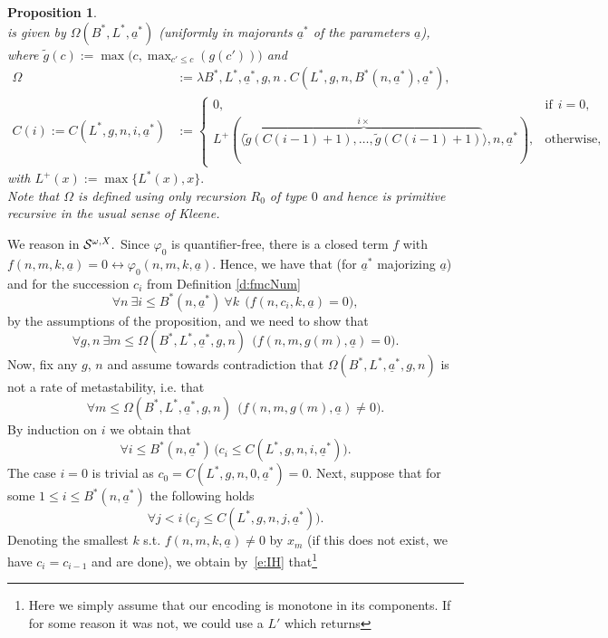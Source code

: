 \documentclass[1p]{elsarticle}
\newcommand{\be}[1][{e:\arabic{equation}}] { \begin{equation}\label{#1} }
\newcommand{\ee} { \end{equation} }
\newcommand{\Tif}{\text{if}\ }
\newcommand{\Telse}{\text{otherwise}}
\theoremstyle{plain}
\newtheorem{prop}[thm]{Proposition}
\theoremstyle{definition}
\theoremstyle{remark}
\renewenvironment{proof}[1][]{\noindent{\bf Proof{#1}. }}{\nopagebreak[4]{\hspace*{\fill}
  $\Box$              %
 }{\vspace{2ex}}}
\renewcommand{\phi}{\varphi}
\theoremstyle{definition}
\begin{document}
{\begin{prop}
\[\]
is given by $\Omega(B^*,L^*,\underline{a}^*)$ 
(uniformly in majorants $\underline{a}^*$ of 
the parameters $\underline{a}$), where 
$\tilde g(c):=\max\big(c,\max_{c'\leq c}(g(c'))\big)$ and
\begin{align*} 
  \Omega&:=\lambda B^*,L^*,\underline{a}^*,g,n\ .\ C(L^*,g,n,
B^*(n,\underline{a}^*),\underline{a}^*),\\
C(i):=C(L^*,g,n,i,\underline{a}^*)&:=
\begin{cases}0,&\Tif\ i=0,\\ L^+(\langle\overbrace{ \tilde g(C(i-1)+1),\ldots,\tilde g(C(i-1)+1) }^{i\times}\rangle,n,\underline{a}^*),&\Telse,\end{cases}
\end{align*}
with $L^+(x):=\max\{ L^*(x),x\}.$ \\ 
Note that $\Omega$ is defined using only recursion $R_0$ of type $0$ and 
hence is primitive recursive in the usual sense of Kleene.
\end{prop}
\begin{proof} We reason in ${\cal S}^{\omega,X}.$
Since $\phi_0$ is quantifier-free, there is a closed term $f$ with 
$f(n,m,k,\underline{a})=0\leftrightarrow \phi_0(n,m,k,\underline{a})$. 
Hence, we have that (for $\underline{a}^*$ majorizing $\underline{a}$) and 
for the succession $c_i$ from Definition \ref{d:fmcNum} 
\[ \forall n\ \exists i\leq B^*(n,\underline{a}^*)\ \forall k\ \ \big( 
f(n,c_i,k,\underline{a})=0 \big), \]
by the assumptions of the proposition, and we need to show that
\[ \forall g,n\ \exists m\leq \Omega(B^*,L^*,\underline{a}^*,g,n) 
\ \ \big( f(n,m,g(m),\underline{a})=0 \big). \]
Now, fix any $g$, $n$ and assume towards contradiction that 
$\Omega(B^*,L^*,\underline{a}^*,g,n)$ is not a rate of metastability, i.e. that
\be[e:NE] 
\forall m\leq \Omega(B^*,L^*,\underline{a}^*,g,n)  \ \ \big( f(n,m,g(m),\underline{a})\neq0 \big).
\ee
By induction on $i$ we obtain that
\be[e:IC] 
\forall i\leq B^*(n,\underline{a}^*) \,\big(c_i\leq 
C(L^*,g,n,i,\underline{a}^*)
\big).
\ee
The case $i=0$ is trivial as $c_0=C(L^*,g,n,0,\underline{a}^*)=0$. 
Next, suppose that for some 
$1\leq i\leq B^*(n,\underline{a}^*)$ the following holds
\be[e:IH] 
\forall j<i\ \big(c_j\leq C(L^*,g,n,j,\underline{a}^*)\big). 
\ee
Denoting the smallest $k$ s.t. $f(n,m,k,\underline{a})\neq0$ by $x_m$ 
(if this does not exist, we have $c_i=c_{i-1}$ and are done), 
we obtain by~\eqref{e:IH} that\footnote{Here
we simply assume that our encoding is monotone in its components. If for some reason it was not, we could use a $L'$ which returns
}
\end{proof}}
\end{document}

